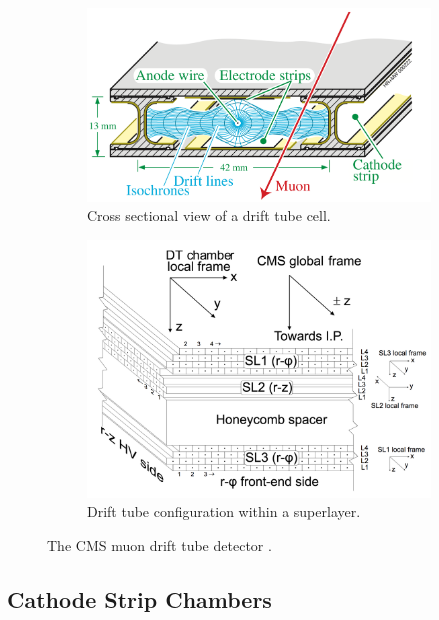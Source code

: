 \begin{figure}
\centering
\begin{subfigure}[c]{0.475\textwidth}
\includegraphics[width=\textwidth]{figs/dtcell.png}
\caption{Cross sectional view of a drift tube cell.}
\end{subfigure}
\begin{subfigure}[c]{0.475\textwidth}
\includegraphics[width=\textwidth]{figs/superlayer.png}
\caption{Drift tube configuration within a superlayer.}
\end{subfigure}
\caption[The CMS muon drift tube detector.]{The CMS muon drift tube detector \cite{dtcellpic}.}
\label{fig:superlayer}
\end{figure}

\subsection{Cathode Strip Chambers}

